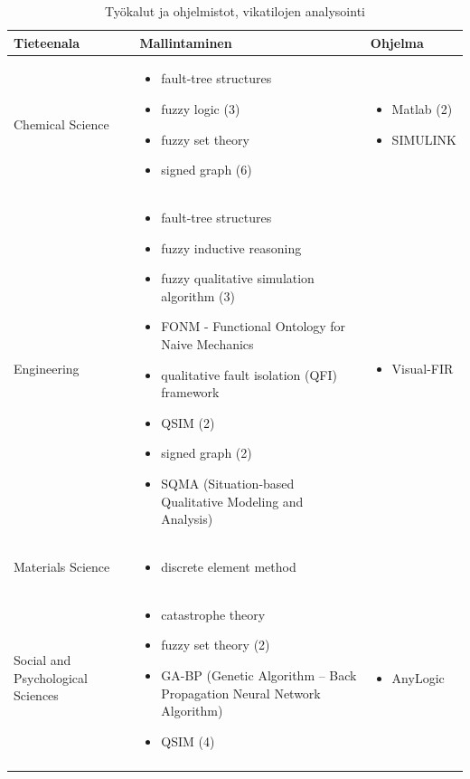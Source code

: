 \documentclass[utf8]{gradu3}
\begin{document}
\begin{longtable}[h]{|p{4cm}|p{6cm}|p{5cm}|}
    \hline
    \textbf{Tieteenala}    &    \textbf{Mallintaminen} & \textbf{Ohjelma}\\
    \hline
    Chemical Science & \begin{itemize}
        \item fault-tree structures
        \item fuzzy logic (3)
        \item fuzzy set theory
        \item signed graph (6)
    \end{itemize} & 
    \begin{itemize}
        \item Matlab (2)
        \item SIMULINK
    \end{itemize}
    \\
    \hline
    Engineering & \begin{itemize}
        \item fault-tree structures
        \item fuzzy inductive reasoning
        \item fuzzy qualitative simulation algorithm (3)
        \item FONM - Functional Ontology for Naive Mechanics 
        \item qualitative fault isolation (QFI) framework
        \item QSIM (2)
        \item signed graph (2)
        \item SQMA (Situation-based Qualitative Modeling and Analysis)
    \end{itemize} & 
    \begin{itemize}
        \item Visual-FIR
    \end{itemize}
    \\
    \hline
    Materials Science & \begin{itemize}
        \item discrete element method
    \end{itemize} &
    
    \\
    \hline
    Social and Psychological Sciences & \begin{itemize}
        \item catastrophe theory
        \item fuzzy set theory (2)
        \item GA-BP (Genetic Algorithm – Back Propagation Neural Network Algorithm)
        \item QSIM (4)
    \end{itemize} & 
    \begin{itemize}
        \item AnyLogic
    \end{itemize}
    \\   
    \hline
    \caption{Työkalut ja ohjelmistot, vikatilojen analysointi}
    \label{table:mallintaminen 2.}
\end{longtable}
\end{document}
